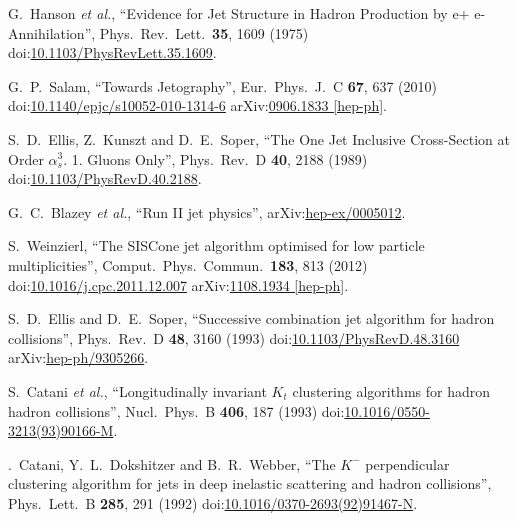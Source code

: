 \begin{thebibliography}{99}
G.~Hanson {\it et al.}, ``Evidence for Jet Structure in Hadron Production by e+ e- Annihilation'', Phys.\ Rev.\ Lett.\ {\bf 35}, 1609 (1975) doi:\href{http://dx.doi.org/10.1103/PhysRevLett.35.1609}{10.1103/PhysRevLett.35.1609}.


G.~P.~Salam, ``Towards Jetography'', Eur.\ Phys.\ J.\ C {\bf 67}, 637 (2010) doi:\href{http://dx.doi.org/10.1140/epjc/s10052-010-1314-6}{10.1140/epjc/s10052-010-1314-6} arXiv:\href{http://arxiv.org/abs/arXiv:0906.1833}{0906.1833 [hep-ph]}.

S.~D.~Ellis, Z.~Kunszt and D.~E.~Soper, ``The One Jet Inclusive Cross-Section at Order $\alpha^3_s$. 1. Gluons Only'', Phys.\ Rev.\ D {\bf 40}, 2188 (1989) doi:\href{http://dx.doi.org/10.1103/PhysRevD.40.2188}{10.1103/PhysRevD.40.2188}.

G.~C.~Blazey {\it et al.}, ``Run II jet physics'', arXiv:\href{https://arxiv.org/abs/hep-ex/0005012}{hep-ex/0005012}.

S.~Weinzierl, ``The SISCone jet algorithm optimised for low particle multiplicities'', Comput.\ Phys.\ Commun.\ {\bf 183}, 813 (2012) doi:\href{http://dx.doi.org/10.1016/j.cpc.2011.12.007}{10.1016/j.cpc.2011.12.007} arXiv:\href{http://arxiv.org/abs/arXiv:1108.1934}{1108.1934 [hep-ph]}.

S.~D.~Ellis and D.~E.~Soper, ``Successive combination jet algorithm for hadron collisions'', Phys.\ Rev.\ D {\bf 48}, 3160 (1993) doi:\href{http://dx.doi.org/10.1103/PhysRevD.48.3160}{10.1103/PhysRevD.48.3160} arXiv:\href{http://arxiv.org/abs/hep-ph/9305266}{hep-ph/9305266}.

S.~Catani {\it et al.}, ``Longitudinally invariant $K_t$ clustering algorithms for hadron hadron collisions'', Nucl.\ Phys.\ B {\bf 406}, 187 (1993) doi:\href{http://dx.doi.org/10.1016/0550-3213(93)90166-M}{10.1016/0550-3213(93)90166-M}.

.~Catani, Y.~L.~Dokshitzer and B.~R.~Webber, ``The $K^-$ perpendicular clustering algorithm for jets in deep inelastic scattering and hadron collisions'', Phys.\ Lett.\ B {\bf 285}, 291 (1992) doi:\href{http://dx.doi.org/10.1016/0370-2693(92)91467-N}{10.1016/0370-2693(92)91467-N}.


\end{thebibliography}

